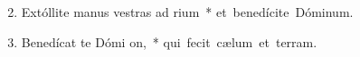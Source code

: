 \begin{flushleft}
\begin{enumerate}[leftmargin=*]
\setcounter{enumi}{1}
\item Extóllite manus vestras ad rium~* \mbox{et benedícite Dóminum.}

\item Benedícat te Dómi  on,~* \mbox{qui fecit cælum et terram.}
\end{enumerate}
\end{flushleft}
